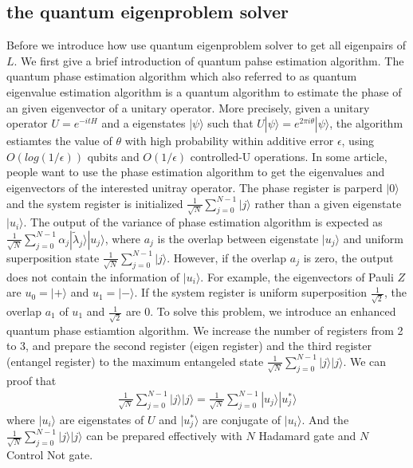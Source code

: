 \documentclass[twocolumn,notitlepage]{revtex4-1}
\def\ket#1{| #1 \rangle}
\begin{document}
\subsection{the quantum eigenproblem solver}
Before we introduce how use quantum eigenproblem solver to get all eigenpairs of $L$. We first give a brief introduction of quantum pahse estimation algorithm.
The quantum phase estimation algorithm which also referred to as quantum eigenvalue estimation algorithm is a quantum algorithm to estimate the phase of an given eigenvector of a unitary operator. 
More precisely, given a unitary operator $U=e^{-itH}$ and a eigenstates $\ket{\psi}$ such that $U\ket{\psi}=e^{2\pi i \theta}\ket{\psi}$, the algorithm estiamtes the value of $\theta$ with high probability within additive error $\epsilon$, using $O(log(1/\epsilon))$ qubits and $O(1/\epsilon)$ controlled-U operations.
In some article, people want to use the phase estimation algorithm to get the eigenvalues and eigenvectors of the interested unitray operator. 
The phase register is parperd $\ket{0}$ and the system register is initialized $\frac{1}{\sqrt{N}}\sum_{j=0}^{N-1}\ket{j}$ rather than a given eigenstate $\ket{u_i}$. 
The output of the variance of phase estimation algorithm is expected as $\frac{1}{\sqrt{N}}\sum_{j=0}^{N-1}\alpha_{j}\ket{\widetilde{\lambda}_{j}}\ket{u_j}$, where $a_j$ is the overlap between eigenstate $\ket{u_j}$ and uniform superposition state $\frac{1}{\sqrt{N}}\sum_{j=0}^{N-1}\ket{j}$. 
However, if the overlap $a_j$ is zero, the output does not contain the information of $\ket{u_i}$. 
For example, the eigenvectors of Pauli $Z$ are $u_{0}=\ket{+}$ and $u_{1}=\ket{-}$. 
If the system register is uniform superposition $\frac{1}{\sqrt{2}}$, the overlap $a_1$ of $u_{1}$ and  $\frac{1}{\sqrt{2}}$ are 0.
To solve this problem, we introduce an enhanced quantum phase estiamtion algorithm. We increase the number of registers from 2 to 3, and prepare the second register (eigen register) and the third register (entangel register) to the maximum entangeled state $\frac{1}{\sqrt{N}}\sum_{j=0}^{N-1}\ket{j}\ket{j}$.
We can proof that
\begin{align}
    \frac{1}{\sqrt{N}}\sum_{j=0}^{N-1}\ket{j}\ket{j}=\frac{1}{\sqrt{N}}\sum_{j=0}^{N-1}\ket{u_j}\ket{u_j^*}
\end{align}
where $\ket{u_i}$ are eigenstates of $U$ and $\ket{u_j^*}$ are conjugate of $\ket{u_i}$. And the $\frac{1}{\sqrt{N}}\sum_{j=0}^{N-1}\ket{j}\ket{j}$ can be prepared effectively with $N$ Hadamard gate and $N$ Control Not gate.
\end{document}
